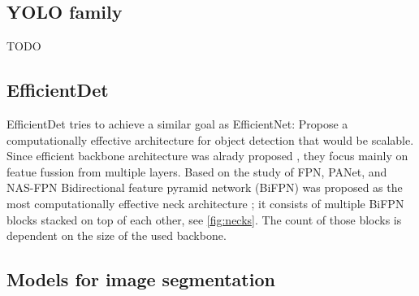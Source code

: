 \subsection{YOLO family}
TODO

\subsection{EfficientDet}
EfficientDet tries to achieve a similar goal as EfficientNet: Propose a computationally effective architecture for object detection that would be scalable. Since efficient backbone architecture was alrady proposed \cite{Tan2019a}, they focus mainly on featue fussion from multiple layers. Based on the study of FPN, PANet, and NAS-FPN Bidirectional feature pyramid network (BiFPN) was proposed as the most computationally effective neck architecture \cite{Tan2019}; it consists of multiple BiFPN blocks stacked on top of each other, see \ref{fig:necks}. The count of those blocks is dependent on the size of the used backbone.

\subsection{Models for image segmentation}
